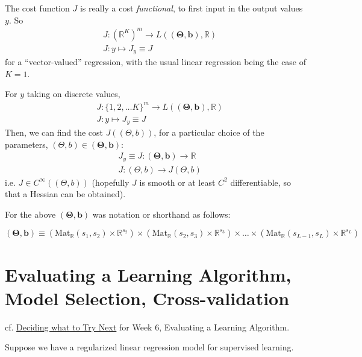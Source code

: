 \documentclass[10pt]{amsart}
\begin{document}
\begin{multicols*}{2}
The cost function $J$ is really a cost \emph{functional}, to first input in the output values $y$.  So
\begin{equation}
\begin{aligned}
  &  J: (\mathbb{R}^K)^m \to L(\mathbf{ (\Theta, b) }, \mathbb{R} ) \\ 
& J: y \mapsto J_y \equiv J 
\end{aligned}
\end{equation}
for a ``vector-valued'' regression, with the usual linear regression being the case of $K=1$.

For $y$ taking on discrete values,
\begin{equation}
\begin{aligned}
  & J: \lbrace 1, 2, \dots K \rbrace^m \to L( \mathbf{ (\Theta ,b) } , \mathbb{R} ) \\ 
  & J: y \mapsto J_y \equiv J 
  \end{aligned}
  \end{equation}
Then, we can find the cost $J((\Theta, b))$, for a particular choice of the parameters, $(\Theta,b) \in \mathbf{ (\Theta,b)}$:
\begin{equation}
\begin{aligned}
 &  J_y \equiv J : \mathbf{ ( \Theta,b) } \to \mathbb{R} \\ 
 & J: (\Theta,b) \to J(\Theta,b)
  \end{aligned}
  \end{equation}
i.e. $J \in C^{\infty}((\Theta,b))$ (hopefully $J$ is smooth or at least $C^2$ differentiable, so that a Hessian can be obtained).


For the above $\mathbf{ (\Theta,b)}$ was notation or shorthand as follows:

\[
\mathbf{ (\Theta,b ) } \equiv (\text{Mat}_{\mathbb{R}}(s_1,s_2) \times \mathbb{R}^{s_2}) \times (\text{Mat}_{\mathbb{R}}(s_2,s_3) \times \mathbb{R}^{s_3} ) \times \dots \times (\text{Mat}_{\mathbb{R}}(s_{L-1},s_L) \times \mathbb{R}^{s_L} )
\]

\section{Evaluating a Learning Algorithm, Model Selection, Cross-validation}  

cf. \href{https://www.coursera.org/learn/machine-learning/lecture/OVM4M/deciding-what-to-try-next}{Deciding what to Try Next} for Week 6, Evaluating a Learning Algorithm.  

Suppose we have a regularized linear regression model for supervised learning.  


\end{multicols*}
\end{document}

